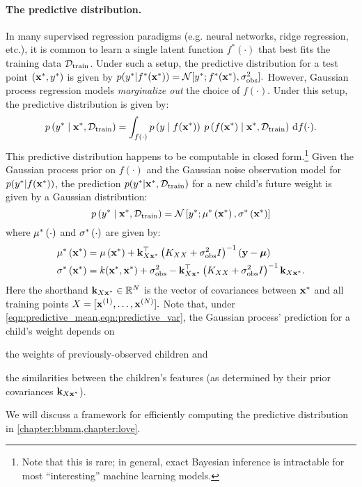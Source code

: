 \paragraph{The predictive distribution.}
In many supervised regression paradigms (e.g. neural networks, ridge regression, etc.), it is common to learn a single latent function $f^*(\cdot)$ that best fits the training data $\mathcal D_\text{train}$.
Under such a setup, the predictive distribution for a test point $(\mathbf{x}^*, y^*)$ is given by
$ p(\ytest \vert f^*(\bxtest)) = \normaldist{ \ytest; f^*(\bxtest) }{ \sigma^2_\text{obs} }. $
However, Gaussian process regression models \emph{marginalize out} the choice of $f(\cdot)$.
Under this setup, the predictive distribution is given by:
\begin{equation*}
  p \left( y^* \mid \mathbf{x}^*, \mathcal D_\text{train} \right)
  = \int_{f(\cdot)} p\left( y \mid f(\mathbf{x}^*) \right) \: p\left( f(\mathbf{x}^*) \mid \mathbf{x}^*, \mathcal D_\text{train} \right)
  \,\mathrm{d}{f}(\cdot).
\end{equation*}
%
This predictive distribution happens to be computable in closed form.\footnote{
  Note that this is rare; in general, exact Bayesian inference is intractable for most ``interesting'' machine learning models.
}
Given the Gaussian process prior on $f(\cdot)$ and the Gaussian noise observation model for $p(y^* \vert f(\mathbf{x}^*))$, the prediction $p(y^* \vert \mathbf{x}^*, \mathcal D_\text{train})$ for a new child's future weight is given by a Gaussian distribution:
%
\begin{equation}
  p \left(
    \ytest \mid \bxtest, \dset_\text{train}
  \right)
  = \normaldist{ \ytest ; \meantest{\bxtest}}{ \covtest{\bxtest} }
  \label{eqn:predictive}
\end{equation}
%
where $\mu^* \left( \cdot \right)$ and $\sigma^* \left( \cdot \right)$ are given by:
%
\begin{align}
  \mu^* \left( \mathbf{x}^* \right)
  &= \mu\left( \mathbf{x}^* \right) + \mathbf{k}_{X \mathbf{x}^*}^\top \left( K_{XX} + \sigma_\text{obs}^2 I \right)^{-1} \left( \mathbf{y} - \boldsymbol{\mu} \right)
  \label{eqn:predictive_mean}
  \\
  \sigma^* \left( \mathbf{x}^* \right)
  &= k ( \mathbf{x}^*, \mathbf{x}^*) + \sigma^2_\text{obs} - \mathbf{k}_{X \mathbf{x}^*}^\top \left( K_{XX} + \sigma_\text{obs}^2 I \right)^{-1} \mathbf{k}_{X \mathbf{x}^*}.
  \label{eqn:predictive_var}
\end{align}
%
Here the shorthand $\mathbf{k}_{X \mathbf{x}^*} \in \mathbb{R}^N$ is the vector of covariances between $\mathbf{x}^*$ and all training points $X = [\mathbf{x}^{(1)}, \ldots, \mathbf{x}^{(N)}].$
Note that, under \cref{eqn:predictive_mean,eqn:predictive_var}, the Gaussian process' prediction for a child's weight depends on
\begin{enumerate*}
  \item the weights of previously-observed children and
  \item the similarities between the children's features (as determined by their prior covariances $\mathbf{k}_{X \mathbf{x}^*}$).
\end{enumerate*}
We will discuss a framework for efficiently computing the predictive distribution in \cref{chapter:bbmm,chapter:love}.


